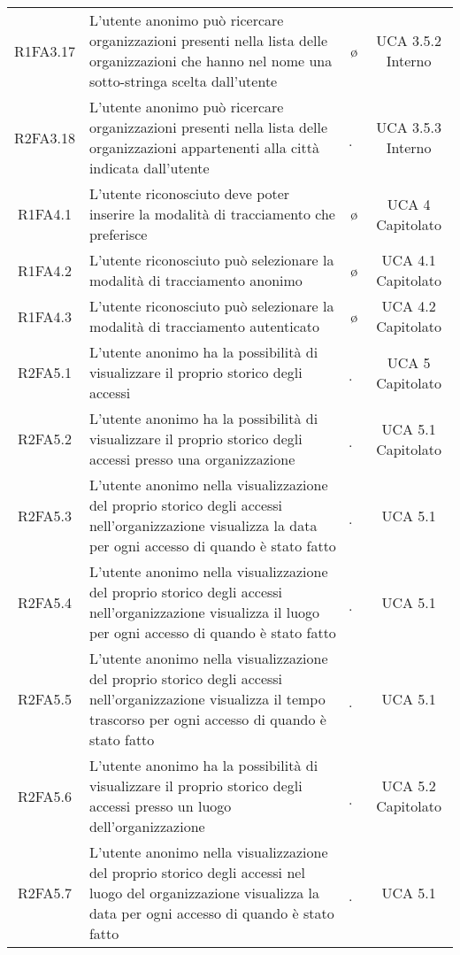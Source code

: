 {\begin{longtable}{ c C{8cm} c c}
R1FA3.17 & L’utente anonimo può ricercare organizzazioni presenti nella lista delle organizzazioni che hanno nel nome una sotto-stringa scelta dall'utente & \o & UCA 3.5.2 Interno \\

R2FA3.18 & L’utente anonimo può ricercare organizzazioni presenti nella lista delle organizzazioni appartenenti alla città indicata dall’utente & \d & UCA 3.5.3 Interno \\

R1FA4.1 & L’utente riconosciuto deve poter inserire la modalità di tracciamento che preferisce & \o & UCA 4 Capitolato \\

R1FA4.2 & L’utente riconosciuto può selezionare la modalità di tracciamento anonimo & \o & UCA 4.1 Capitolato \\

R1FA4.3 & L’utente riconosciuto può selezionare la modalità di tracciamento autenticato & \o & UCA 4.2 Capitolato \\

R2FA5.1 & L’utente anonimo ha la possibilità di visualizzare il proprio storico degli accessi & \d & UCA 5 Capitolato \\

R2FA5.2 & L’utente anonimo ha la possibilità di visualizzare il proprio storico degli accessi presso una organizzazione  & \d & UCA 5.1 Capitolato \\

R2FA5.3 & L'utente anonimo nella visualizzazione del proprio storico degli accessi nell'organizzazione visualizza la data per ogni accesso di quando è stato fatto & \d &  UCA 5.1 \\

R2FA5.4 & L'utente anonimo nella visualizzazione del proprio storico degli accessi nell'organizzazione visualizza il luogo per ogni accesso di quando è stato fatto & \d &  UCA 5.1 \\

R2FA5.5 & L'utente anonimo nella visualizzazione del proprio storico degli accessi nell'organizzazione visualizza il tempo trascorso per ogni accesso di quando è stato fatto & \d &  UCA 5.1 \\

R2FA5.6 & L’utente anonimo ha la possibilità di visualizzare il proprio storico degli accessi presso un luogo dell’organizzazione & \d & UCA 5.2 Capitolato\\

R2FA5.7 & L'utente anonimo nella visualizzazione del proprio storico degli accessi nel luogo del organizzazione visualizza la data per ogni accesso di quando è stato fatto & \d &  UCA 5.1 \\


\end{longtable}}
